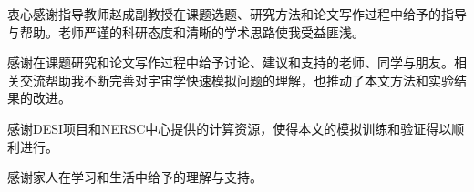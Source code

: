 
\begin{acknowledgements}
  衷心感谢指导教师赵成副教授在课题选题、研究方法和论文写作过程中给予的指导与帮助。老师严谨的科研态度和清晰的学术思路使我受益匪浅。

  感谢在课题研究和论文写作过程中给予讨论、建议和支持的老师、同学与朋友。相关交流帮助我不断完善对宇宙学快速模拟问题的理解，也推动了本文方法和实验结果的改进。
  
  感谢DESI项目和NERSC中心提供的计算资源，使得本文的模拟训练和验证得以顺利进行。

  感谢家人在学习和生活中给予的理解与支持。
\end{acknowledgements}
